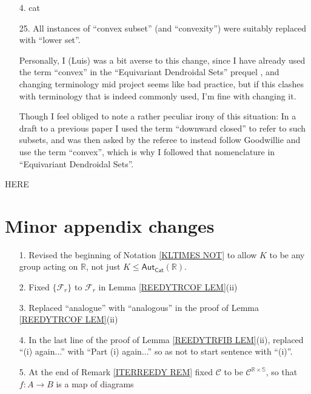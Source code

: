 \documentclass{article}
\begin{document}

\begin{itemize}
	\item[4.] cat
	\item[25.] All instances of ``convex subset'' (and ``convexity'') were suitably replaced with ``lower set''.
	
	Personally, I (Luis) was a bit averse to this change,
	since I have already used the term ``convex'' in the
	``Equivariant Dendroidal Sets'' prequel \cite{Per18},
	and changing terminology mid project seems like bad practice,
	but if this clashes with terminology that is indeed commonly used, I'm fine with changing it.
	
	Though I feel obliged to note a rather peculiar irony of this situation:
	In a draft to a previous paper I used the term
	``downward closed'' to refer to such subsets,
	and was then asked by the referee to 
	instead follow Goodwillie and use the term ``convex'',
	which is why I followed that nomenclature in 
	``Equivariant Dendroidal Sets''.
\end{itemize}




{\color{red} HERE}

\section{Minor appendix changes}

\begin{itemize}
	
\item[1.] Revised the beginning of Notation \ref{KLTIMES NOT}
to allow $K$ to be any group acting on $\mathbb{R}$,
not just $K \leq \mathsf{Aut}_{\mathsf{Cat}}(\mathbb{R})$. 	

\item[2.] Fixed $\{\mathcal{F}_r\}$
to $\mathcal{F}_r$ in Lemma \ref{REEDYTRCOF LEM}(ii)
     
\item[3.] Replaced ``analogue'' with ``analogous'' in the proof of Lemma \ref{REEDYTRCOF LEM}(ii)

\item[4.]
In the last line of the proof of Lemma \ref{REEDYTRFIB LEM}(ii),
replaced ``(i) again...'' with ``Part (i) again...''
so as not to start sentence with ``(i)''.

\item[5.]
At the end of Remark \ref{ITERREEDY REM}
fixed $\mathcal{C}$
to be $\mathcal{C}^{\mathbb{R} \times \mathbb{S}}$,
so that $f\colon A \to B$ is a map of diagrams
\end{itemize}
\end{document}
